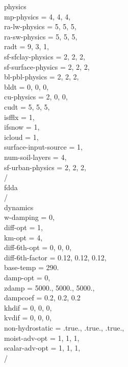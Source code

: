 \documentclass[a4paper,12pt]{article}
\numberwithin{equation}{section} %
\begin{document}
 physics\\
 mp-physics                          = 4,     4,     4,\\
 ra-lw-physics                       = 5,     5,     5,\\
 ra-sw-physics                       = 5,     5,     5,\\
 radt                                = 9,     3,     1,\\
 sf-sfclay-physics                   = 2,     2,     2,\\
 sf-surface-physics                  = 2,     2,     2,\\
 bl-pbl-physics                      = 2,     2,     2,\\
 bldt                                = 0,     0,     0,\\
 cu-physics                          = 2,     0,     0,\\
 cudt                                = 5,     5,     5,\\
 isfflx                              = 1,\\
 ifsnow                              = 1,\\
 icloud                              = 1,\\
 surface-input-source                = 1,\\
 num-soil-layers                     = 4,\\
 sf-urban-physics                    = 2,     2,     2,\\
 /\\

 fdda\\
 /\\

 dynamics\\
 w-damping                           = 0,\\
 diff-opt                            = 1,\\
 km-opt                              = 4,\\
 diff-6th-opt                        = 0,     0,      0,\\
 diff-6th-factor                     = 0.12,   0.12,   0.12,\\
 base-temp                           = 290.\\
 damp-opt                            = 0,\\
 zdamp                               = 5000.,  5000.,  5000.,\\
 dampcoef                            = 0.2,    0.2,    0.2\\
 khdif                               = 0,      0,      0,\\
 kvdif                               = 0,      0,      0,\\
 non-hydrostatic                     = .true., .true., .true.,\\
 moist-adv-opt                       = 1,      1,      1,     \\
 scalar-adv-opt                      = 1,      1,      1,     \\
 /\\
\end{document}
